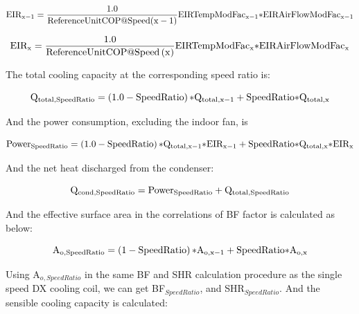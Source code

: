 \begin{equation}
{\rm{EI}}{{\rm{R}}_{{\rm{x}} - 1}} = \frac{{1.0}}{{{\rm{ReferenceUnitCOP}}@{\rm{Speed}}({\rm{x}} - 1)}}{\rm{EIRTempModFa}}{{\rm{c}}_{{\rm{x}} - 1}}{\rm{*EIRAirFlowModFa}}{{\rm{c}}_{{\rm{x}} - 1}}
\end{equation}

\begin{equation}
{\rm{EI}}{{\rm{R}}_{\rm{x}}} = \frac{{1.0}}{{{\rm{ReferenceUnitCOP}}@{\rm{Speed}}\left( {\rm{x}} \right)}}{\rm{EIRTempModFa}}{{\rm{c}}_{\rm{x}}}{\rm{*EIRAirFlowModFa}}{{\rm{c}}_{\rm{x}}}
\end{equation}

The total cooling capacity at the corresponding speed ratio is:

\begin{equation}
{{\rm{Q}}_{{\rm{total}},{\rm{SpeedRatio}}}} = \left( {1.0 - {\rm{SpeedRatio}}} \right){\rm{*}}{{\rm{Q}}_{{\rm{total}},{\rm{x}} - 1}} + {\rm{SpeedRatio*}}{{\rm{Q}}_{{\rm{total}},{\rm{x}}}}
\end{equation}

And the power consumption, excluding the indoor fan, is

\begin{equation}
{\rm{Powe}}{{\rm{r}}_{{\rm{SpeedRatio}}}} = \left( {1.0 - {\rm{SpeedRatio}}} \right){\rm{*}}{{\rm{Q}}_{{\rm{total}},{\rm{x}} - 1}}{\rm{*EI}}{{\rm{R}}_{{\rm{x}} - 1}} + {\rm{SpeedRatio*}}{{\rm{Q}}_{{\rm{total}},{\rm{x}}}}{\rm{*EI}}{{\rm{R}}_{\rm{x}}}
\end{equation}

And the net heat discharged from the condenser:

\begin{equation}
{{\rm{Q}}_{{\rm{cond}},{\rm{SpeedRatio}}}} = {\rm{Powe}}{{\rm{r}}_{{\rm{SpeedRatio}}}} + {{\rm{Q}}_{{\rm{total}},{\rm{SpeedRatio}}}}
\end{equation}

And the effective surface area in the correlations of BF factor is calculated as below:

\begin{equation}
{{\rm{A}}_{{\rm{o}},{\rm{SpeedRatio}}}} = \left( {1 - {\rm{SpeedRatio}}} \right){\rm{*}}{{\rm{A}}_{{\rm{o}},{\rm{x}} - 1}} + {\rm{SpeedRatio*}}{{\rm{A}}_{{\rm{o}},{\rm{x}}}}
\end{equation}

Using A\(_{o,SpeedRatio}\) in the same BF and SHR calculation procedure as the single speed DX cooling coil, we can get BF\(_{SpeedRatio}\), and SHR\(_{SpeedRatio}\). And the sensible cooling capacity is calculated:

